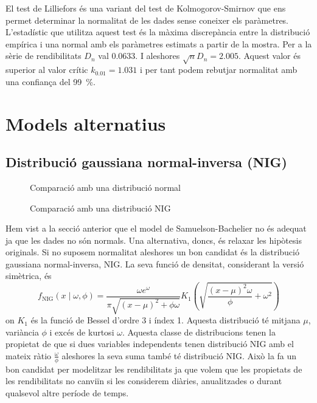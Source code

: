 \documentclass{article}
\numberwithin{table}{section}
\numberwithin{figure}{section}
\numberwithin{equation}{section}
\begin{document}
El test de Lilliefors és una variant del test de Kolmogorov-Smirnov que ens permet determinar la normalitat de les dades sense coneixer els paràmetres. L'estadístic que utilitza aquest test és la màxima discrepància entre la distribució empírica i una normal amb els paràmetres estimats a partir de la mostra. Per a la sèrie de rendibilitats \( D_n \) val \num{0.0633}. I aleshores \( \sqrt{n}D_n = 2.005 \). Aquest valor és superior al valor crític \( k_{0.01} = 1.031 \) i per tant podem rebutjar normalitat amb una confiança del \SI{99}{\percent}.

\section{Models alternatius}
\subsection{Distribució gaussiana normal-inversa (NIG)}
\begin{figure}[htb]
	\centering \sffamily \small
	
	\caption{Comparació amb una distribució normal}
	\label{fig:comparacio normal}
\end{figure}
\begin{figure}[htb]
	\centering \sffamily \small
	
	\caption{Comparació amb una distribució NIG}
	\label{fig:comparacio nig}
\end{figure}

Hem vist a la secció anterior que el model de Samuelson-Bachelier no és adequat ja que les dades no són normals. Una alternativa, doncs, és relaxar les hipòtesis originals. Si no suposem normalitat aleshores un bon candidat és la distribució gaussiana normal-inversa, NIG. La seva funció de densitat, considerant la versió simètrica, és
\begin{equation*}
	f_{\text{NIG}}(x \mid \omega, \phi) = \frac{\omega e^{\omega}}{\pi \sqrt{(x - \mu)^2 + \phi \omega}} K_1 \left(\sqrt{\frac{(x - \mu)^2 \omega}{\phi} + \omega^2}\right) 
\end{equation*}
on \( K_1 \) és la funció de Bessel d'ordre 3 i índex 1. Aquesta distribució té mitjana \( \mu \), variància \( \phi \) i excés de kurtosi \( \omega \). Aquesta classe de distribucions tenen la propietat de que si dues variables independents tenen distribució NIG amb el mateix ràtio \( \frac{\omega}{\phi} \) aleshores la seva suma també té distribució NIG. Això la fa un bon candidat per modelitzar les rendibilitats ja que volem que les propietats de les rendibilitats no canviïn si les considerem diàries, anualitzades o durant qualsevol altre període de temps. 
\end{document}
